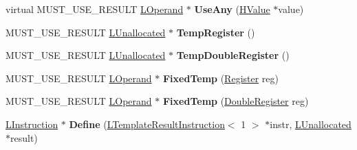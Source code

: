 \begin{DoxyCompactItemize}
\item 
virtual M\+U\+S\+T\+\_\+\+U\+S\+E\+\_\+\+R\+E\+S\+U\+LT \hyperlink{classv8_1_1internal_1_1_l_operand}{L\+Operand} $\ast$ {\bfseries Use\+Any} (\hyperlink{classv8_1_1internal_1_1_h_value}{H\+Value} $\ast$value)\hypertarget{classv8_1_1internal_1_1_l_chunk_builder_a0e599f63d9e6b55c6951a2c027640147}{}\label{classv8_1_1internal_1_1_l_chunk_builder_a0e599f63d9e6b55c6951a2c027640147}

\item 
M\+U\+S\+T\+\_\+\+U\+S\+E\+\_\+\+R\+E\+S\+U\+LT \hyperlink{classv8_1_1internal_1_1_l_unallocated}{L\+Unallocated} $\ast$ {\bfseries Temp\+Register} ()\hypertarget{classv8_1_1internal_1_1_l_chunk_builder_a4ba4ae71849e93fc59cb527dce3dbeea}{}\label{classv8_1_1internal_1_1_l_chunk_builder_a4ba4ae71849e93fc59cb527dce3dbeea}

\item 
M\+U\+S\+T\+\_\+\+U\+S\+E\+\_\+\+R\+E\+S\+U\+LT \hyperlink{classv8_1_1internal_1_1_l_unallocated}{L\+Unallocated} $\ast$ {\bfseries Temp\+Double\+Register} ()\hypertarget{classv8_1_1internal_1_1_l_chunk_builder_a524f9d3d8fb435bb5c2232a108423493}{}\label{classv8_1_1internal_1_1_l_chunk_builder_a524f9d3d8fb435bb5c2232a108423493}

\item 
M\+U\+S\+T\+\_\+\+U\+S\+E\+\_\+\+R\+E\+S\+U\+LT \hyperlink{classv8_1_1internal_1_1_l_operand}{L\+Operand} $\ast$ {\bfseries Fixed\+Temp} (\hyperlink{structv8_1_1internal_1_1_register}{Register} reg)\hypertarget{classv8_1_1internal_1_1_l_chunk_builder_a0e9a78fbc1b87c8a44c721e93143b26e}{}\label{classv8_1_1internal_1_1_l_chunk_builder_a0e9a78fbc1b87c8a44c721e93143b26e}

\item 
M\+U\+S\+T\+\_\+\+U\+S\+E\+\_\+\+R\+E\+S\+U\+LT \hyperlink{classv8_1_1internal_1_1_l_operand}{L\+Operand} $\ast$ {\bfseries Fixed\+Temp} (\hyperlink{structv8_1_1internal_1_1_double_register}{Double\+Register} reg)\hypertarget{classv8_1_1internal_1_1_l_chunk_builder_adab20084d9ddf5e0e2c369ada7049b2e}{}\label{classv8_1_1internal_1_1_l_chunk_builder_adab20084d9ddf5e0e2c369ada7049b2e}

\item 
\hyperlink{classv8_1_1internal_1_1_l_instruction}{L\+Instruction} $\ast$ {\bfseries Define} (\hyperlink{classv8_1_1internal_1_1_l_template_result_instruction}{L\+Template\+Result\+Instruction}$<$ 1 $>$ $\ast$instr, \hyperlink{classv8_1_1internal_1_1_l_unallocated}{L\+Unallocated} $\ast$result)\hypertarget{classv8_1_1internal_1_1_l_chunk_builder_afd009a30c72fe37dd1b35d4241854ca0}{}\label{classv8_1_1internal_1_1_l_chunk_builder_afd009a30c72fe37dd1b35d4241854ca0}


\end{DoxyCompactItemize}

